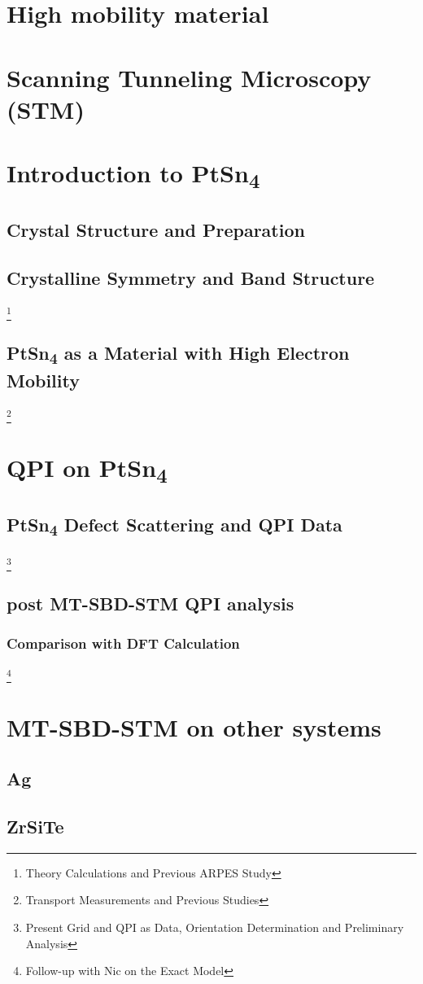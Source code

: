 \chapter{High mobility material}

\chapter{Scanning Tunneling Microscopy (STM)}
	

\chapter{Introduction to PtSn\textsubscript{4}}
	\section{Crystal Structure and Preparation}
	\section{Crystalline Symmetry and Band Structure} 
\footnote{Theory Calculations and Previous ARPES Study}
	\section{PtSn\textsubscript{4} as a Material with High Electron Mobility}
	\footnote{Transport Measurements and Previous Studies}






	

\chapter{QPI on PtSn\textsubscript{4}}
\section{PtSn\textsubscript{4} Defect Scattering and QPI Data}
\footnote{Present Grid and QPI as Data, Orientation Determination and Preliminary Analysis}
\section{post MT-SBD-STM QPI analysis}
\subsection{Comparison with DFT Calculation}
\footnote{Follow-up with Nic on the Exact Model}

\chapter{MT-SBD-STM on other systems}
\section{Ag}
\section{ZrSiTe}